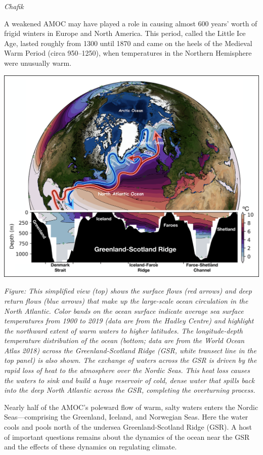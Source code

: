 \documentclass[
]{book}
\begin{document}
\emph{Chafik}

A weakened AMOC may have played a role in causing almost 600 years' worth of frigid winters in Europe and North America. This period, called the Little Ice Age, lasted roughly from 1300 until 1870 and came on the heels of the Medieval Warm Period (circa 950--1250), when temperatures in the Northern Hemisphere were unusually warm.

\includegraphics{fig/surface-deep-circulation-north-atlantic.png}

\emph{Figure: This simplified view (top) shows the surface flows (red arrows) and deep return flows (blue arrows) that make up the large-scale ocean circulation in the North Atlantic. Color bands on the ocean surface indicate average sea surface temperatures from 1900 to 2019 (data are from the Hadley Centre) and highlight the northward extent of warm waters to higher latitudes. The longitude-depth temperature distribution of the ocean (bottom; data are from the World Ocean Atlas 2018) across the Greenland-Scotland Ridge (GSR, white transect line in the top panel) is also shown. The exchange of waters across the GSR is driven by the rapid loss of heat to the atmosphere over the Nordic Seas. This heat loss causes the waters to sink and build a huge reservoir of cold, dense water that spills back into the deep North Atlantic across the GSR, completing the overturning process.}

Nearly half of the AMOC's poleward flow of warm, salty waters enters the Nordic Seas---comprising the Greenland, Iceland, and Norwegian Seas. Here the water cools and pools north of the undersea Greenland-Scotland Ridge (GSR).
A host of important questions remains about the dynamics of the ocean near the GSR and the effects of these dynamics on regulating climate.
\end{document}
